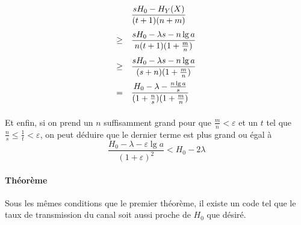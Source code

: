 	\[
		\def\arraystretch{2.5}
		\begin{array}{c>{\displaystyle}l}
		&\frac{sH_0-H_Y(X)}{(t+1)(n+m)}\\
		\ge&\frac{sH_0-\lambda s-n\lg a}{n(t+1)(1+\frac{m}{n})}\\
		\ge&\frac{sH_0-\lambda s-n\lg a}{(s+n)(1+\frac{m}{n})}\\
		=&\frac{H_0-\lambda-\frac{n\lg a}{s}}{(1+\frac{n}{s})(1+\frac{m}{n})}\\
		\end{array}
	\]
	
	\paragraph{}
	Et enfin, si on prend un $n$ suffisamment grand pour que 
	$\frac{m}{n}<\varepsilon$ et un $t$ tel que
	$\frac{n}{s} \le \frac{1}{t} < \varepsilon$, on peut 
	déduire que le dernier terme est plus grand ou égal à
	\[\frac{H_0-\lambda-\varepsilon\lg a}{(1+\varepsilon)^2}<H_0-2\lambda\]
	
	
	
	
	
	
	
	
	\paragraph{Théorème}
	Sous les mêmes conditions que le premier théorème, il existe un code tel
	que le taux de transmission du canal soit aussi proche de $H_0$ que désiré.

